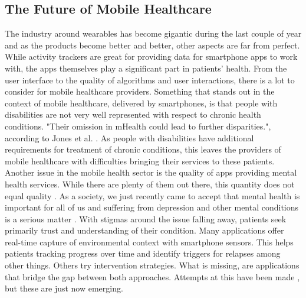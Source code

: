 \subsection{The Future of Mobile Healthcare}
The industry around wearables has become gigantic during the last couple of year \cite{wearableMarket} and as the products become better and better, other aspects are far from perfect.
While activity trackers are great for providing data for smartphone apps to work with, the apps themselves play a significant part in patients' health. From the user interface to the quality of algorithms and user interactions, there is a lot to consider for mobile healthcare providers. Something that stands out in the context of mobile healthcare, delivered by smartphones, is that people with disabilities are not very well represented with respect to chronic health conditions. "Their omission in mHealth could lead to further disparities.", according to Jones et al. \cite{jones2018mobile}. As people with disabilities have additional requirements for treatment of chronic conditions, this leaves the providers of mobile healthcare with difficulties bringing their services to these patients. \\
Another issue in the mobile health sector is the quality of apps providing mental health services. While there are plenty of them out there, this quantity does not equal quality \cite{torous2017needed}. As a society, we just recently came to accept that mental health is important for all of us and suffering from depression and other mental conditions is a serious matter \cite{bharadwaj2017mental}. With stigmas around the issue falling away, patients seek primarily trust and understanding of their condition. Many applications offer real-time capture of environmental context with smartphone sensors. This helps patients tracking progress over time and identify triggers for relapses among other things. Others try intervention strategies. What is missing, are applications that bridge the gap between both approaches. Attempts at this have been made \cite{torous2019creating}, but these are just now emerging.
